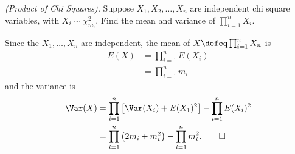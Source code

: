 \begin{problem}[Handout 13, \# 19]
  \emph{(Product of Chi Squares).} Suppose \(X_1,X_2,\dotsc,X_n\) are
  independent chi square variables, with \(X_i\sim\chi_{m_i}^2\). Find the
  mean and variance of \(\prod_{i=1}^n X_i\).
\end{problem}
\begin{solution}
  Since the \(X_1,\dotsc,X_n\) are independent, the mean of
  \(X\defeq\prod_{i=1}^n X_n\) is
  \begin{align*}
    E(X)
    &=\prod_{i=1}^n E(X_i)\\
    &=\prod_{i=1}^n m_i
  \end{align*}
  and the variance is
  \begin{align*}
    \Var(X)
    &=\prod_{i=1}^n\left[\Var(X_i)+E(X_1)^2\right]-\prod_{i=1}^nE(X_i)^2\\
    &=\prod_{i=1}^n\left(2m_i+m_i^2\right)-\prod_{i=1}^n m_i^2.\qedhere
  \end{align*}
\end{solution}
\newpage

